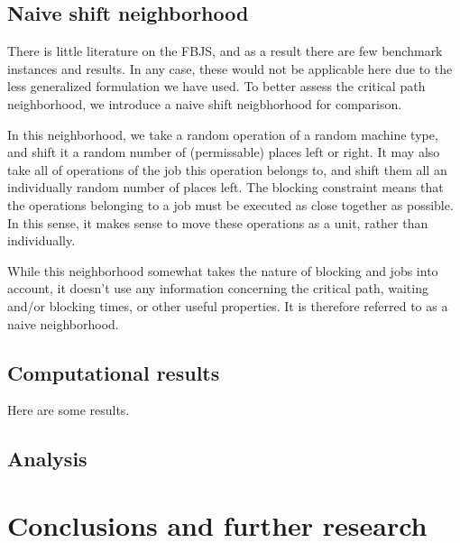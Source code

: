 \documentclass[a4paper,10pt]{article}
\begin{document}
\subsection{Naive shift neighborhood}

There is little literature on the FBJS, and as a result there are few benchmark instances and results. In any case, these would not be applicable here due to the less generalized formulation we have used. To better assess the critical path neighborhood, we introduce a naive shift neigbhorhood for comparison.

In this neighborhood, we take a random operation of a random machine type, and shift it a random number of (permissable) places left or right. It may also take all of operations of the job this operation belongs to, and shift them all an individually random number of places left. The blocking constraint means that the operations belonging to a job must be executed as close together as possible. In this sense, it makes sense to move these operations as a unit, rather than individually.

While this neighborhood somewhat takes the nature of blocking and jobs into account, it doesn't use any information concerning the critical path, waiting and/or blocking times, or other useful properties. It is therefore referred to as a naive neighborhood.

\subsection{Computational results}

Here are some results.

\subsection{Analysis}

\section{Conclusions and further research}

\printbibliography[heading=bibintoc]
\end{document}
